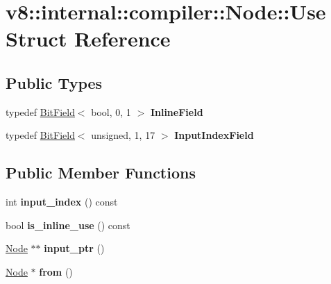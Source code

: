 \hypertarget{structv8_1_1internal_1_1compiler_1_1_node_1_1_use}{}\section{v8\+:\+:internal\+:\+:compiler\+:\+:Node\+:\+:Use Struct Reference}
\label{structv8_1_1internal_1_1compiler_1_1_node_1_1_use}
\subsection*{Public Types}
\begin{DoxyCompactItemize}
\item 
typedef \hyperlink{classv8_1_1internal_1_1_bit_field}{Bit\+Field}$<$ bool, 0, 1 $>$ {\bfseries Inline\+Field}\hypertarget{structv8_1_1internal_1_1compiler_1_1_node_1_1_use_a381d4ef03b9be14b023de4e9fd5274a2}{}\label{structv8_1_1internal_1_1compiler_1_1_node_1_1_use_a381d4ef03b9be14b023de4e9fd5274a2}

\item 
typedef \hyperlink{classv8_1_1internal_1_1_bit_field}{Bit\+Field}$<$ unsigned, 1, 17 $>$ {\bfseries Input\+Index\+Field}\hypertarget{structv8_1_1internal_1_1compiler_1_1_node_1_1_use_a212fe0599687f33830665b36d80b4bfe}{}\label{structv8_1_1internal_1_1compiler_1_1_node_1_1_use_a212fe0599687f33830665b36d80b4bfe}

\end{DoxyCompactItemize}
\subsection*{Public Member Functions}
\begin{DoxyCompactItemize}
\item 
int {\bfseries input\+\_\+index} () const \hypertarget{structv8_1_1internal_1_1compiler_1_1_node_1_1_use_abbe5844040f4c659c8ac9cfd28205230}{}\label{structv8_1_1internal_1_1compiler_1_1_node_1_1_use_abbe5844040f4c659c8ac9cfd28205230}

\item 
bool {\bfseries is\+\_\+inline\+\_\+use} () const \hypertarget{structv8_1_1internal_1_1compiler_1_1_node_1_1_use_a96d6b8e8ec0ed4f2bb743912471967c3}{}\label{structv8_1_1internal_1_1compiler_1_1_node_1_1_use_a96d6b8e8ec0ed4f2bb743912471967c3}

\item 
\hyperlink{classv8_1_1internal_1_1compiler_1_1_node}{Node} $\ast$$\ast$ {\bfseries input\+\_\+ptr} ()\hypertarget{structv8_1_1internal_1_1compiler_1_1_node_1_1_use_aef4c243ac98c6ee3eaa03b2fd13f5a4b}{}\label{structv8_1_1internal_1_1compiler_1_1_node_1_1_use_aef4c243ac98c6ee3eaa03b2fd13f5a4b}

\item 
\hyperlink{classv8_1_1internal_1_1compiler_1_1_node}{Node} $\ast$ {\bfseries from} ()\hypertarget{structv8_1_1internal_1_1compiler_1_1_node_1_1_use_a81b20d92d1bba610720b944599ed5118}{}\label{structv8_1_1internal_1_1compiler_1_1_node_1_1_use_a81b20d92d1bba610720b944599ed5118}

\end{DoxyCompactItemize}
